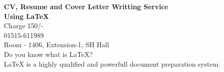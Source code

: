 \documentclass{article}
\begin{document}
\vspace*{\fill}
\begin{center}
 \LARGE{\textbf{CV, Resume and Cover Letter Writting Service\\Using \LaTeX{}}}
\\
\vspace{2cm}
\Large{Charge 150/-}\\
 \faPhone{} 01515-611989\\
  \faHome{} Room - 1406, Extension-1, SH Hall
\\
\vspace{2cm}
Do you know what is \LaTeX{}?\\
\LaTeX{} is a highly qualified and powerfull document preparation system.
\end{center}
\vspace*{\fill}
 
\end{document}

